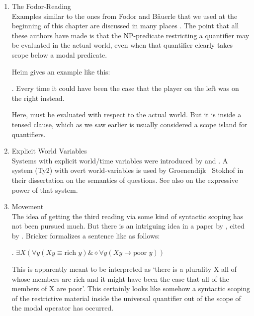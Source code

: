 \begin{enumerate}
  \medskip\item The Fodor-Reading\\[6pt]
  Examples similar to the ones from Fodor and Bäuerle that we used at the beginning of this chapter are discussed in many places \citep{ioup:specificity77, hellan:scope78, abusch:1994:indefinites, bonomi:transp95, farkas:scope97}. The point that all these authors have made is that the NP-predicate restricting a quantifier may be evaluated in the actual world, even when that quantifier clearly takes scope below a modal predicate.
  
  Heim \citep{heim:artikel} gives an example like this:
  
  \ex. Every time it could have been the case that the player on the left was on the right instead.
  
  Here,  must be evaluated with respect to the actual world. But it is inside a tensed clause, which \dash as we saw earlier \dash is usually considered a scope island for quantifiers.
  
  \medskip\item Explicit World Variables\\[6pt]
  Systems with explicit world/time variables were introduced by \citet{tichy:approach} and \citet{gallin:intensional}. A system (Ty2) with overt world-variables is used by Groenendijk \amp\ Stokhof in their dissertation on the semantics of questions. See also \citet{zimmermann:diss} on the expressive power of that system.
  
  \medskip\item Movement\\[6pt]
  The idea of getting the third reading via some kind of syntactic scoping has not been pursued much. But there is an intriguing idea in a paper by \citet{bricker:pluraldere:89}, cited by \citet[p. 76]{cresswell:entities}. Bricker formalizes a sentence like  as follows:
  
  \ex. $\exists X(\forall y(Xy \equiv \mbox{rich } y) \& \diamond\forall y(Xy \rightarrow \mbox{poor }y))$
  
  This is apparently meant to be interpreted as `there is a plurality X all of whose members are rich and it might have been the case that all of the members of X are poor'. This certainly looks like somehow a syntactic scoping of the restrictive material inside the universal quantifier out of the scope of the modal operator has occurred.
\end{enumerate}

